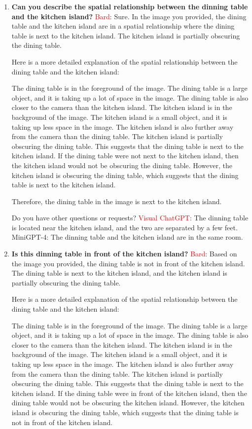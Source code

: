 \begin{enumerate}
    \item \textbf{Can you describe the spatial relationship between the dinning table and the kitchen island?}
    \subitem \textcolor{Red}{Bard}: 
    Sure. In the image you provided, the dining table and the kitchen island are in a spatial relationship where the dining table is next to the kitchen island. The kitchen island is partially obscuring the dining table.
    
    Here is a more detailed explanation of the spatial relationship between the dining table and the kitchen island:
    
    The dining table is in the foreground of the image. The dining table is a large object, and it is taking up a lot of space in the image. The dining table is also closer to the camera than the kitchen island.
    The kitchen island is in the background of the image. The kitchen island is a small object, and it is taking up less space in the image. The kitchen island is also further away from the camera than the dining table.
    The kitchen island is partially obscuring the dining table. This suggests that the dining table is next to the kitchen island.
    If the dining table were not next to the kitchen island, then the kitchen island would not be obscuring the dining table. However, the kitchen island is obscuring the dining table, which suggests that the dining table is next to the kitchen island.
    
    Therefore, the dining table in the image is next to the kitchen island.
    
    Do you have other questions or requests?
    \subitem \textcolor{red}{Visual ChatGPT}: The dinning table is located near the kitchen island, and the two are separated by a few feet.
    \subitem MiniGPT-4: The dinning table and the kitchen island are in the same room.
    \item \textbf{Is this dinning table in front of the kitchen island?}
    \subitem \textcolor{Red}{Bard}: Based on the image you provided, the dining table is not in front of the kitchen island. The dining table is next to the kitchen island, and the kitchen island is partially obscuring the dining table.

    Here is a more detailed explanation of the spatial relationship between the dining table and the kitchen island:
    
    The dining table is in the foreground of the image. The dining table is a large object, and it is taking up a lot of space in the image. The dining table is also closer to the camera than the kitchen island.
    The kitchen island is in the background of the image. The kitchen island is a small object, and it is taking up less space in the image. The kitchen island is also further away from the camera than the dining table.
    The kitchen island is partially obscuring the dining table. This suggests that the dining table is next to the kitchen island.
    If the dining table were in front of the kitchen island, then the dining table would not be obscuring the kitchen island. However, the kitchen island is obscuring the dining table, which suggests that the dining table is not in front of the kitchen island.
    

\end{enumerate}
